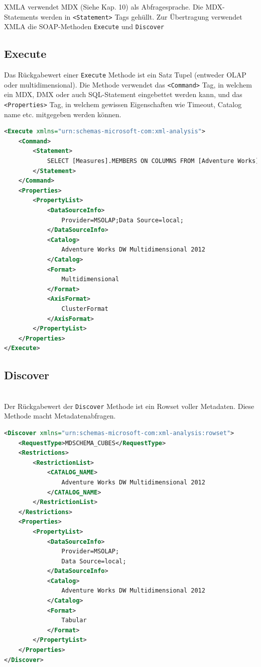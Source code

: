 \documentclass[a4paper, 11pt, nofootinbib]{article}
\newcommand{\code}[1]{\texttt{#1}}
\begin{document}
XMLA verwendet MDX (Siehe Kap. 10) als Abfragesprache. Die MDX-Statements werden in \code{<Statement>} Tags gehüllt. Zur Übertragung verwendet XMLA die SOAP-Methoden \code{Execute} und \code{Discover}

\subsection{Execute}
Das Rückgabewert einer \code{Execute} Methode ist ein Satz Tupel (entweder OLAP oder multidimensional). Die Methode verwendet das \code{<Command>} Tag, in welchem ein MDX, DMX oder auch SQL-Statement eingebettet werden kann, und das \code{<Properties>} Tag, in welchem gewissen Eigenschaften wie Timeout, Catalog name etc. mitgegeben werden können.

\begin{lstlisting}[language=xml, captionpos=b, caption={MDX-SELECT Statement mit XMLA übermittelt}]
<Execute xmlns="urn:schemas-microsoft-com:xml-analysis">
	<Command>
		<Statement>
			SELECT [Measures].MEMBERS ON COLUMNS FROM [Adventure Works]
		</Statement>
	</Command>
	<Properties>
		<PropertyList>
			<DataSourceInfo>
				Provider=MSOLAP;Data Source=local;
			</DataSourceInfo>
			<Catalog>
				Adventure Works DW Multidimensional 2012
			</Catalog>
			<Format>
				Multidimensional
			</Format>
			<AxisFormat>
				ClusterFormat
			</AxisFormat>
		</PropertyList>
	</Properties>
</Execute>
\end{lstlisting}

\newpage

\subsection{Discover}\mbox{}\\
Der Rückgabewert der \code{Discover} Methode ist ein Rowset voller Metadaten. Diese Methode macht Metadatenabfragen.

\begin{lstlisting}[language=xml, captionpos=b, caption={Anfrage für Cube-Listen aus der einem bestimmten Catalog mit XMLA übermittelt}]
<Discover xmlns="urn:schemas-microsoft-com:xml-analysis:rowset">
	<RequestType>MDSCHEMA_CUBES</RequestType>
	<Restrictions>
		<RestrictionList>
			<CATALOG_NAME>
				Adventure Works DW Multidimensional 2012
			</CATALOG_NAME>
		</RestrictionList>
	</Restrictions>
	<Properties>
		<PropertyList>
			<DataSourceInfo>
				Provider=MSOLAP;
				Data Source=local;
			</DataSourceInfo>
			<Catalog>
				Adventure Works DW Multidimensional 2012
			</Catalog>
			<Format>
				Tabular
			</Format>
		</PropertyList>
	</Properties>
</Discover>
\end{lstlisting}
\end{document}
